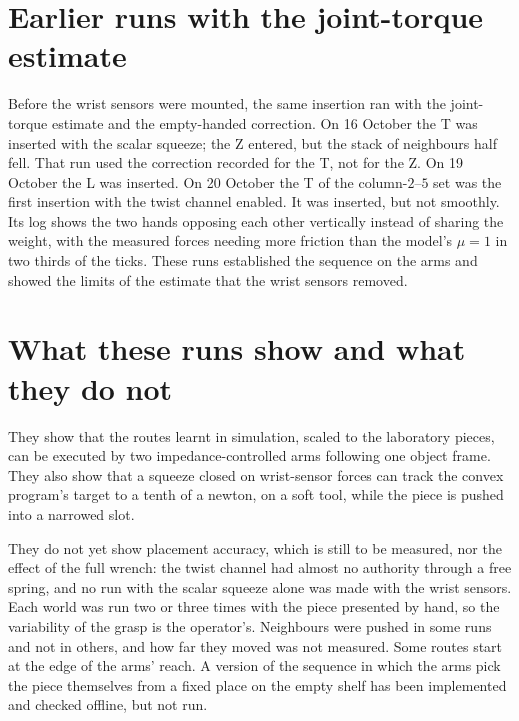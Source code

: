 \section{Earlier runs with the joint-torque estimate}

Before the wrist sensors were mounted, the same insertion ran with the joint-torque estimate and the empty-handed correction. On 16 October the T was inserted with the scalar squeeze; the Z entered, but the stack of neighbours half fell. That run used the correction recorded for the T, not for the Z. On 19 October the L was inserted. On 20 October the T of the column-$2$--$5$ set was the first insertion with the twist channel enabled. It was inserted, but not smoothly. Its log shows the two hands opposing each other vertically instead of sharing the weight, with the measured forces needing more friction than the model's $\mu=1$ in two thirds of the ticks. These runs established the sequence on the arms and showed the limits of the estimate that the wrist sensors removed.

\section{What these runs show and what they do not}

They show that the routes learnt in simulation, scaled to the laboratory pieces, can be executed by two impedance-controlled arms following one object frame. They also show that a squeeze closed on wrist-sensor forces can track the convex program's target to a tenth of a newton, on a soft tool, while the piece is pushed into a narrowed slot.

They do not yet show placement accuracy, which is still to be measured, nor the effect of the full wrench: the twist channel had almost no authority through a free spring, and no run with the scalar squeeze alone was made with the wrist sensors. Each world was run two or three times with the piece presented by hand, so the variability of the grasp is the operator's. Neighbours were pushed in some runs and not in others, and how far they moved was not measured. Some routes start at the edge of the arms' reach. A version of the sequence in which the arms pick the piece themselves from a fixed place on the empty shelf has been implemented and checked offline, but not run.

